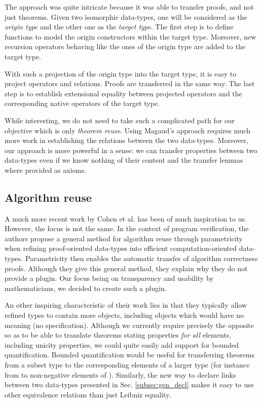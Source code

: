 \documentclass{llncs}
\begin{document}
The approach was quite intricate because it was able to transfer
proofs, and not just theorems. Given two isomorphic data-types,
one will be considered as the \emph{origin type} and
the other one as the \emph{target type}.
The first step is to define functions to model the origin constructors
within the target type. Moreover, new recursion operators behaving like
the ones of the origin type are added to the target type.

With such a projection of the origin type into the target type, it is
easy to project operators and relations. Proofs are transferred in the
same way. The last step is to establish extensional equality between
projected operators and the corresponding native operators of the
target type.

While interesting, we do not need to take such a complicated path for
our objective which is only \emph{theorem reuse}. Using Magaud's approach
requires much more work in establishing the relations between the two
data-types. Moreover, our approach is more powerful in a sense: we can
transfer properties between two data-types even if we know nothing of
their content and the transfer lemmas where provided as axioms.

\subsection{Algorithm reuse}

A much more recent work by Cohen et al. \cite{Cohen2013} has been of much
inspiration to us. However, the focus is not the same.
In the context of program verification, the authors
propose a general method for algorithm reuse through
parametricity when refining proof-oriented data-types into efficient
computation-oriented data-types. Parametricity then enables the
automatic transfer of algorithm correctness proofs.
Although they give this general method, they explain why they do not
provide a plugin. Our focus being on transparency and usability by
mathematicians, we decided to create such a plugin.

An other inspiring characteristic of their work lies in that
they typically allow
refined types to contain more objects, including objects which would have
no meaning (no specification).
Although we currently require precisely the opposite so as to be
able to translate theorems stating properties \emph{for all} elements,
including unicity properties, we could quite easily add support for
bounded quantification. Bounded quantification would be useful for
transferring theorems from a subset type to the corresponding elements
of a larger type (for instance from  to non-negative elements
of ). Similarly, the new way to declare links between two
data-types presented in Sec. \ref{subsec:gen_decl} makes it easy to use
other equivalence relations than just Leibniz equality.
\end{document}
